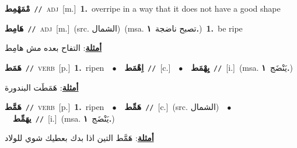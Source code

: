 \documentclass[10pt,a4paper,twoside]{article} %
\begin{document}
\begin{multicols}{2}
{\setlength\topsep{0pt}\textbf{\foreignlanguage{arabic}{مْمَهْمِط}}\ {\color{gray}\texttt{//}\color{black}}\ \textsc{adj}\ [m.]\ \textbf{1.}~overripe in a way that it does not have a good shape\ } \vspace{2mm}

{\setlength\topsep{0pt}\textbf{\foreignlanguage{arabic}{هَامِط}}\ {\color{gray}\texttt{//}\color{black}}\ \textsc{adj}\ [m.]\ (src. \color{gray}\foreignlanguage{arabic}{الشمال}\color{black})\ \color{gray}(msa. \foreignlanguage{arabic}{تصبح ناضجة}~\foreignlanguage{arabic}{\textbf{١.}})\color{black}\ \textbf{1.}~be ripe\  \begin{flushright}\color{gray}\foreignlanguage{arabic}{\textbf{\underline{\foreignlanguage{arabic}{أمثلة}}}: التفاح بعده مش هامِط}\end{flushright}\color{black}} \vspace{2mm}

{\setlength\topsep{0pt}\textbf{\foreignlanguage{arabic}{هَمَط}}\ {\color{gray}\texttt{//}\color{black}}\ \textsc{verb}\ [p.]\ \textbf{1.}~ripen\ \ $\bullet$\ \ \setlength\topsep{0pt}\textbf{\foreignlanguage{arabic}{اِهْمَط}}\ {\color{gray}\texttt{//}\color{black}}\ [c.]\ \ $\bullet$\ \ \setlength\topsep{0pt}\textbf{\foreignlanguage{arabic}{يِهْمَط}}\ {\color{gray}\texttt{//}\color{black}}\ [i.]\ \color{gray}(msa. \foreignlanguage{arabic}{يَنْضَج}~\foreignlanguage{arabic}{\textbf{١.}})\color{black}\  \begin{flushright}\color{gray}\foreignlanguage{arabic}{\textbf{\underline{\foreignlanguage{arabic}{أمثلة}}}: هَمَطَت البندورة}\end{flushright}\color{black}} \vspace{2mm}

{\setlength\topsep{0pt}\textbf{\foreignlanguage{arabic}{هَمَّط}}\ {\color{gray}\texttt{//}\color{black}}\ \textsc{verb}\ [p.]\ \textbf{1.}~ripen\ \ $\bullet$\ \ \setlength\topsep{0pt}\textbf{\foreignlanguage{arabic}{هَمِّط}}\ {\color{gray}\texttt{//}\color{black}}\ [c.]\ (src. \color{gray}\foreignlanguage{arabic}{الشمال}\color{black})\ \ $\bullet$\ \ \setlength\topsep{0pt}\textbf{\foreignlanguage{arabic}{يهَمِّط}}\ {\color{gray}\texttt{//}\color{black}}\ [i.]\ \color{gray}(msa. \foreignlanguage{arabic}{يَنْضَج}~\foreignlanguage{arabic}{\textbf{١.}})\color{black}\  \begin{flushright}\color{gray}\foreignlanguage{arabic}{\textbf{\underline{\foreignlanguage{arabic}{أمثلة}}}: هَمَّط التين اذا بدك بعطيك شوي للولاد}\end{flushright}\color{black}} \vspace{2mm}


\end{multicols}
\end{document}
